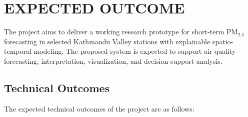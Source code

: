 \chapter{EXPECTED OUTCOME}

The project aims to deliver a working research prototype for short-term PM$_{2.5}$ forecasting in selected Kathmandu Valley stations with explainable spatio-temporal modeling. The proposed system is expected to support air quality forecasting, interpretation, visualization, and decision-support analysis.

\section{Technical Outcomes}

The expected technical outcomes of the project are as follows:

